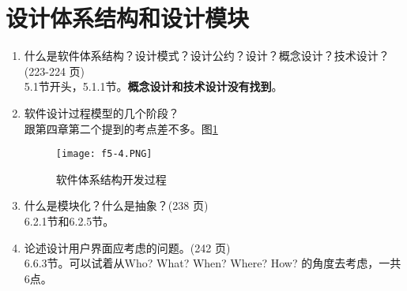 \documentclass[14pt, letterpaper, UTF8, fontset=windowsnew, heading=true]{article}
\begin{document}
\section{设计体系结构和设计模块}

\begin{enumerate}
	\item 什么是软件体系结构？设计模式？设计公约？设计？概念设计？技术设计？(223-224
	页) \\
	5.1节开头，5.1.1节。\textbf{概念设计和技术设计没有找到}。
	
	\item 软件设计过程模型的几个阶段？ \\
	跟第四章第二个提到的考点差不多。图\ref{fig:archtechturedev}
	\begin{figure}[h]
		\centering
		\texttt{[image: f5-4.PNG]}
		\caption{软件体系结构开发过程}
		\label{fig:archtechturedev}
	\end{figure}
	
	
	\item 什么是模块化？什么是抽象？(238 页) \\
	6.2.1节和6.2.5节。
	
	\item 论述设计用户界面应考虑的问题。(242 页) \\
	6.6.3节。可以试着从Who? What? When? Where? How? 的角度去考虑，一共6点。
	

\end{enumerate}
\end{document}
